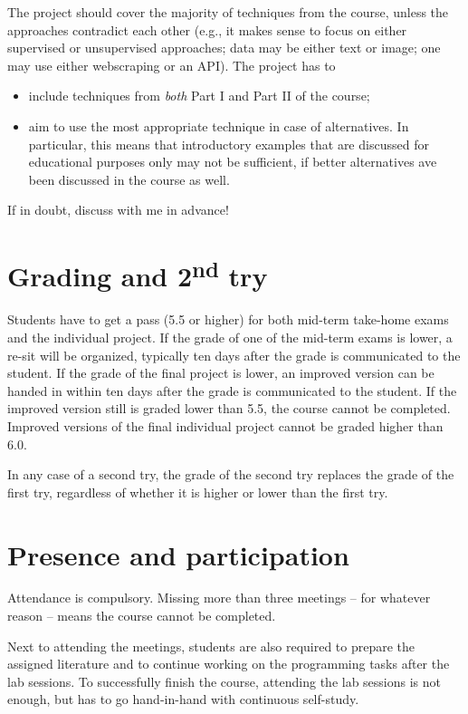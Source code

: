 \documentclass[a4paper,10pt,twocolumn]{report}
\begin{document}
The project should cover the majority of techniques from the course, unless the approaches contradict each other (e.g., it makes sense to focus on either supervised or unsupervised approaches; data may be either text or image; one may use either webscraping or an API).
The project has to
\begin{itemize}
\item include techniques from \emph{both} Part I and Part II of the course;
\item aim to use the most appropriate technique in case of alternatives. In particular, this means that introductory examples that are discussed for educational purposes only may not be sufficient, if better alternatives ave been discussed in the course as well. 
\end{itemize}
If in doubt, discuss with me in advance!




\section{Grading and 2\textsuperscript{nd} try}
Students have to get a pass (5.5 or higher) for both mid-term take-home exams and the individual project. If the grade of one of the mid-term exams is lower, a re-sit will be organized, typically ten days after the grade is communicated to the student.
If the grade of the final project is lower, an improved version can be handed in within ten days after the grade is communicated to the student. If the improved version still is graded lower than 5.5, the course cannot be completed. Improved versions of the final individual project cannot be graded higher than 6.0.

In any case of a second try, the grade of the second try replaces the grade of the first try, regardless of whether it is higher or lower than the first try.

\section{Presence and participation}
Attendance is compulsory. Missing more than three meetings – for whatever reason – means the course cannot be completed.

Next to attending the meetings, students are also required to prepare the assigned literature and to continue working on the programming tasks after the lab sessions. To successfully finish the course, attending the lab sessions is not enough, but has to go hand-in-hand with continuous self-study.
\end{document}
